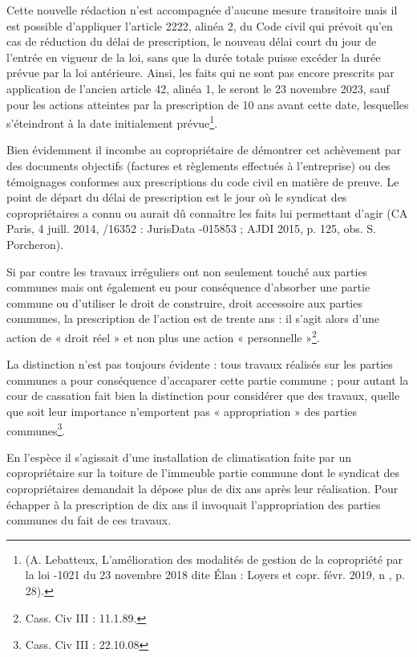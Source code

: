 				Cette nouvelle rédaction n'est accompagnée d'aucune mesure transitoire mais il est possible d'appliquer l'article 2222, alinéa 2, du Code civil qui prévoit qu'en cas de réduction du délai de prescription, le nouveau délai court du jour de l'entrée en vigueur de la loi, sans que la durée totale puisse excéder la durée prévue par la loi antérieure. Ainsi, les faits qui ne sont pas encore prescrits par application de l'ancien article 42, alinéa 1, le seront le 23 novembre 2023, sauf pour les actions atteintes par la prescription de 10 ans avant cette date, lesquelles s'éteindront à la date initialement prévue\footnote{(A. Lebatteux, L'amélioration des modalités de gestion de la copropriété par la loi -1021 du 23 novembre 2018 dite Élan : Loyers et copr. févr. 2019, n , p. 28).}.
				
				Bien évidemment il incombe au copropriétaire de démontrer cet achèvement par des documents objectifs (factures et règlements effectués à l’entreprise) ou des témoignages conformes aux prescriptions du code civil en matière de preuve.
				Le point de départ du délai de prescription est le jour où le syndicat des copropriétaires a connu ou aurait dû connaître les faits lui permettant d'agir (CA Paris, 4 juill. 2014, /16352 : JurisData -015853 ; AJDI 2015, p. 125, obs. S. Porcheron).
				
				Si par contre les travaux irréguliers ont non seulement touché aux parties communes mais ont également eu pour conséquence d’absorber une partie commune ou d’utiliser le droit de construire, droit accessoire aux parties communes, la prescription de l’action est de trente ans : il s’agit alors d’une action de « droit réel » et non plus une action « personnelle »\footnote{Cass. Civ III : 11.1.89.}.
				
				La distinction n’est pas toujours évidente : tous travaux réalisés sur les parties communes a pour conséquence d’accaparer cette partie commune ; pour autant la cour de cassation fait bien la distinction pour considérer que des travaux, quelle que soit leur importance n’emportent pas « appropriation » des parties communes\footnote{Cass. Civ III : 22.10.08}.
				
				En l’espèce il s’agissait d’une installation de climatisation faite par un copropriétaire sur la toiture de l’immeuble partie commune dont le syndicat des copropriétaires demandait la dépose plus de dix ans après leur réalisation. Pour échapper à la prescription de dix ans il invoquait l’appropriation des parties communes du fait de ces travaux.
				
